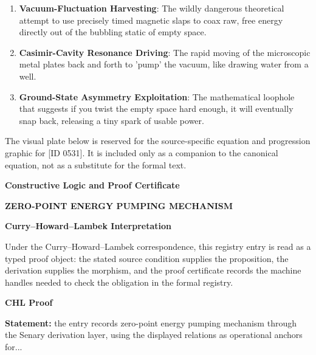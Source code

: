 \begin{enumerate}[leftmargin=1.6em,itemsep=6pt,topsep=4pt]
\item \textbf{Vacuum-Fluctuation Harvesting}: The wildly dangerous theoretical attempt to use precisely timed magnetic slaps to coax raw, free energy directly out of the bubbling static of empty space.
\item \textbf{Casimir-Cavity Resonance Driving}: The rapid moving of the microscopic metal plates back and forth to 'pump' the vacuum, like drawing water from a well.
\item \textbf{Ground-State Asymmetry Exploitation}: The mathematical loophole that suggests if you twist the empty space hard enough, it will eventually snap back, releasing a tiny spark of usable power.
\end{enumerate}

\begingroup\footnotesize\sloppy
The visual plate below is reserved for the source-specific equation and progression graphic for [ID 0531]. It is included only as a companion to the canonical equation, not as a substitute for the formal text.
\par\endgroup
\ifTZPDarkEdition
{}
\fi

\clearpage
\begingroup\tzpsupportsetup
\noindent\textbf{\fontsize{10.8pt}{12.8pt}\selectfont [ID 0531] Constructive Logic and Proof Certificate}\par
\noindent\textbf{\fontsize{10pt}{12pt}\selectfont ZERO-POINT ENERGY PUMPING MECHANISM}\par
\vspace{0.45em}
\begingroup
\footnotesize
\setlength{\parskip}{0.22em}
\setlength{\parindent}{0pt}
\noindent\textbf{Curry--Howard--Lambek Interpretation}\par
Under the Curry--Howard--Lambek correspondence, this registry entry is read as a typed proof
object: the stated source condition supplies the proposition, the derivation supplies the
morphism, and the proof certificate records the machine handles needed to check the obligation
in the formal registry.

\vspace{0.45em}
\noindent\textbf{CHL Proof}\par
\textbf{Statement:} the entry records zero-point energy pumping mechanism through the Senary derivation
layer, using the displayed relations as operational anchors for...

